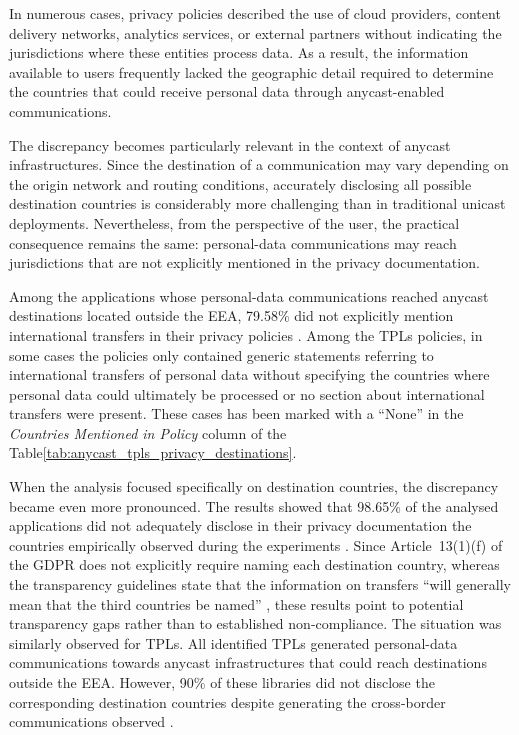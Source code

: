 In numerous cases, privacy policies described the use of cloud providers, content delivery networks, analytics services, or external partners without indicating the jurisdictions where these entities process data. As a result, the information available to users frequently lacked the geographic detail required to determine the countries that could receive personal data through anycast-enabled communications.

The discrepancy becomes particularly relevant in the context of anycast infrastructures. Since the destination of a communication may vary depending on the origin network and routing conditions, accurately disclosing all possible destination countries is considerably more challenging than in traditional unicast deployments. Nevertheless, from the perspective of the user, the practical consequence remains the same: personal-data communications may reach jurisdictions that are not explicitly mentioned in the privacy documentation.

Among the applications whose personal-data communications reached anycast destinations located outside the EEA, 79.58\% did not explicitly mention international transfers in their privacy policies \cite{Pascual2025AnycastDisaster}. Among the TPLs policies, in some cases the policies only contained generic statements referring to international transfers of personal data without specifying the countries where personal data could ultimately be processed or no section about international transfers were present. These cases has been marked with a ``None'' in the \textit{Countries Mentioned in Policy} column of the Table\ref{tab:anycast_tpls_privacy_destinations}.

When the analysis focused specifically on destination countries, the discrepancy became even more pronounced. The results showed that 98.65\% of the analysed applications did not adequately disclose in their privacy documentation the countries empirically observed during the experiments \cite{Pascual2025AnycastDisaster}. Since Article~13(1)(f) of the GDPR does not explicitly require naming each destination country, whereas the transparency guidelines state that the information on transfers ``will generally mean that the third countries be named'' \cite{JUSTICEwp260rev.01}, these results point to potential transparency gaps rather than to established non-compliance. The situation was similarly observed for TPLs. All identified TPLs generated personal-data communications towards anycast infrastructures that could reach destinations outside the EEA. However, 90\% of these libraries did not disclose the corresponding destination countries despite generating the cross-border communications observed \cite{Pascual2025AnycastDisaster}.

